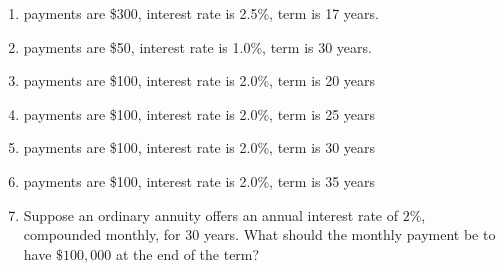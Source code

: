 \documentclass{ximera}
\begin{document}
\begin{enumerate}
\setcounter{enumi}{\value{HW}}

\item payments are \$300, interest rate is 2.5\%, term is 17 years. \label{annuityfirst}

\item payments are \$50, interest rate is 1.0\%,  term is 30 years. 

\item payments are \$100, interest rate is 2.0\%, term is 20 years 

\item  payments are \$100, interest rate is 2.0\%,  term is  25 years

\item  payments are \$100, interest rate is 2.0\%,  term is  30 years


\item  payments are \$100, interest rate is 2.0\%,  term is  35 years
\label{annuitylast}   
 
\item Suppose an ordinary annuity offers an annual interest rate of $2 \%$, compounded monthly, for 30 years. What should the monthly payment be to have $\$100,\!000$ at the end of the term? 

\setcounter{HW}{\value{enumi}}
\end{enumerate}
\end{document}
